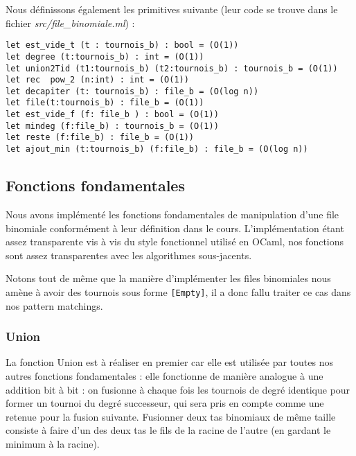\documentclass[12pt,a4paper]{article}
\begin{document}
Nous définissons également les primitives suivante (leur code se trouve dans le fichier \textit{src/file\_binomiale.ml}) :

\bigskip \begin{lstlisting}
let est_vide_t (t : tournois_b) : bool = (O(1))
let degree (t:tournois_b) : int = (O(1))
let union2Tid (t1:tournois_b) (t2:tournois_b) : tournois_b = (O(1))
let rec  pow_2 (n:int) : int = (O(1))
let decapiter (t: tournois_b) : file_b = (O(log n))
let file(t:tournois_b) : file_b = (O(1))
let est_vide_f (f: file_b ) : bool = (O(1))
let mindeg (f:file_b) : tournois_b = (O(1))
let reste (f:file_b) : file_b = (O(1))
let ajout_min (t:tournois_b) (f:file_b) : file_b = (O(log n))
\end{lstlisting} \bigskip

\subsection{Fonctions fondamentales}
Nous avons implémenté les fonctions fondamentales de manipulation d'une file binomiale conformément à leur définition dans le cours. L'implémentation étant assez transparente vis à vis du style fonctionnel utilisé en OCaml, nos fonctions sont assez transparentes avec les algorithmes sous-jacents.

Notons tout de même que la manière d'implémenter les files binomiales nous amène à avoir des tournois sous forme \texttt{[Empty]}, il a donc fallu traiter ce cas dans nos pattern matchings.

\subsubsection{Union}

La fonction Union est à réaliser en premier car elle est utilisée par toutes nos autres fonctions fondamentales : elle fonctionne de manière analogue à une addition bit à bit : on fusionne à chaque fois les tournois de degré identique pour former un tournoi du degré successeur, qui sera pris en compte comme une retenue pour la fusion suivante. Fusionner deux tas binomiaux de même taille consiste à faire d'un des deux tas le fils de la racine de l'autre (en gardant le minimum à la racine).
\end{document}
